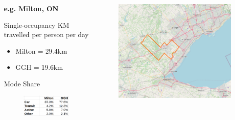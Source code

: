 \documentclass[aspectratio=169]{beamer}
\begin{document}
\begin{frame}

	\begin{columns}
	
	
	
	\begin{column}{0.5\textwidth}
		
		\textbf{e.g. Milton, ON}
		
		\vspace{2mm}
		{Single-occupancy KM travelled per person per day}
		
		\begin{itemize}
			\item Milton = 29.4km
			\item GGH = 19.6km
		\end{itemize}
		
		\vspace{3mm}
		
	{Mode Share}
		
		\begin{figure}

			\includegraphics[width=1.02\linewidth]{images/milton-mode-share.png}
		\end{figure}
		
	\end{column}
	
	\begin{column}{0.5\textwidth}
		
	\begin{figure}

		\includegraphics[width=0.64\linewidth]{images/milton.png}
	\end{figure}
	
		
		
	\end{column}
	
	\end{columns}

\end{frame}
\end{document}
